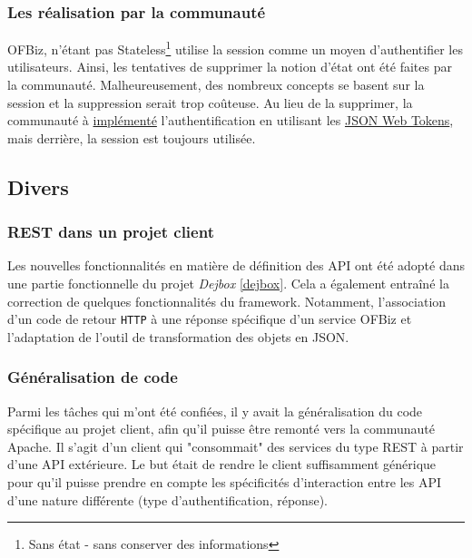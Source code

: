 \subsubsection{Les réalisation par la communauté}
OFBiz, n'étant pas Stateless\footnote{Sans état - sans conserver des informations} utilise la session comme un moyen d'authentifier les utilisateurs. Ainsi, les tentatives de supprimer la notion d'état ont été faites par la communauté. Malheureusement, des nombreux concepts se basent sur la  session et la suppression serait trop coûteuse. Au lieu de la supprimer, la communauté à \href{https://issues.apache.org/jira/browse/OFBIZ-9833}{implémenté} l'authentification en utilisant les \href{https://jwt.io/introduction/}{JSON Web Tokens}, mais derrière, la session est toujours utilisée.
\subsection{Divers}
\subsubsection{REST dans un projet client}
Les nouvelles fonctionnalités en matière de définition des API ont été adopté dans une partie fonctionnelle du projet \emph{Dejbox} \ref{dejbox}. Cela a également entraîné la correction de quelques fonctionnalités du framework. Notamment, l'association d'un code de retour \verb|HTTP| à une réponse spécifique d'un service OFBiz et l'adaptation de l'outil de transformation des objets en JSON.

\subsubsection{Généralisation de code}
Parmi les tâches qui m'ont été confiées, il y avait la généralisation du code spécifique au projet client, afin qu'il puisse être remonté vers la communauté Apache. Il s'agit d'un client qui "consommait" des services du type REST à partir d'une API extérieure. Le but était de rendre le client suffisamment générique pour qu'il puisse prendre en compte les spécificités d'interaction entre les API d'une nature différente (type d'authentification, réponse).


